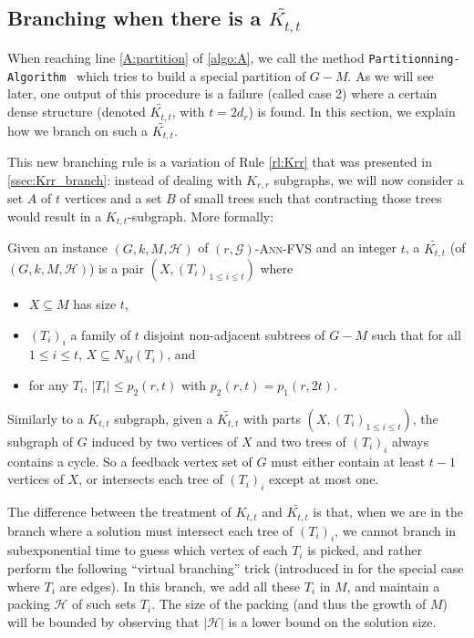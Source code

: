 \documentclass{amsart}
\newcommand{\algopart }{\texttt{Partitionning-Algorithm}~ }
\newcommand{\G}{\mathcal{G}}
\newcommand{\mH}{\mathcal{H}}
\newcommand{\KttTilde}{\widetilde{K_{t,t}}}
\newcommand{\AFVS}{\textsc{$(r,\G)$-Ann-FVS}\xspace}
\newcommand{\ruleref}[1]{\hyperref[#1]{\ref*{#1}}}
\begin{document}
\subsection{Branching when there is a \texorpdfstring{$\KttTilde$}{K~tt}} \label{sec:ktttilde}


When reaching line \ref{A:partition} of \autoref{algo:A}, we call the method \algopart which tries to build a special partition of $G-M$. As we will see later, one output of this procedure is a failure (called case 2) where a certain dense structure (denoted $\KttTilde$, with $t=2d_r$) is found.
In this section, we explain how we branch on such a $\KttTilde$.

This new branching rule is a variation of Rule \ruleref{rl:Krr} that was presented in \autoref{ssec:Krr_branch}: instead of dealing with $K_{r,r}$ subgraphs, we will now consider a set $A$ of $t$ vertices and a set $B$ of small trees such that contracting those trees would result in a $K_{t,t}$-subgraph. More formally:
\begin{definition}
Given an instance $(G,k,M,\mH)$ of \AFVS and an integer $t$, a $\KttTilde$ (of $(G,k,M,\mH)$) is a pair $\left(X, (T_i)_{1\leq i \leq t}\right)$ where
\begin{itemize}
    \item $X\subseteq M$ has size $t$, 
    \item  $(T_i)_i$ a family of $t$ disjoint non-adjacent subtrees of $G - M$ such that for all $1\leq i \leq t$, $X\subseteq N_M(T_i)$, and
    \item for any $T_i$, $|T_i| \le p_2(r,t)$ with $p_2(r,t)=p_1(r,2t)$.
\end{itemize}
\end{definition}



\begin{remark}\label{rmk:Ktttilde}
  Similarly to a $K_{t,t}$ subgraph, given a $\KttTilde$ with parts $(X, (T_i)_{1\leq i \leq t})$, the subgraph of $G$ induced by two vertices of $X$ and two trees of $(T_i)_i$ always contains a cycle. So a feedback vertex set of $G$ must either contain at least $t-1$ vertices of $X$, or intersects each tree of $(T_i)_i$ except at most one. 
\end{remark}
  
  
The difference between the treatment of $K_{t,t}$ and $\KttTilde$ is that, when we are in the branch where a solution must intersect each tree of $(T_i)_i$, we cannot branch in subexponential time to guess which vertex of each $T_i$ is picked, and rather perform the following ``virtual branching'' trick (introduced in \cite{lokSODA22} for the special case where $T_i$ are edges). In this branch, we add all these $T_i$ in $M$, and maintain a packing $\mH$ of such sets $T_i$. The size of the packing (and thus the growth of $M$) will be bounded by observing that $|\mH|$ is a lower bound on the solution size. 
\end{document}
